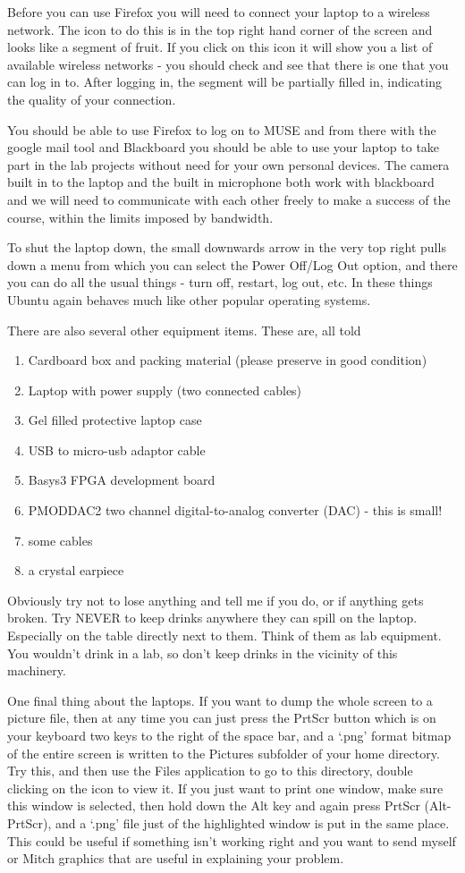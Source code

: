\documentclass[../physical_computing.tex]{subfiles}
\begin{document}
Before you can use Firefox you will need to connect your laptop to a wireless network. The icon to do this is in the top right hand corner of the screen and looks like a segment of fruit. If you click on this icon it will show you a list of available wireless networks - you should check and see that there is one that you can log in to. After logging in, the segment will be partially filled in, indicating the quality of your connection.

You should be able to use Firefox to log on to MUSE and from there with the google mail tool and Blackboard you should be able to use your laptop to take part in the lab projects without need for your own personal devices. The camera built in to the laptop and the built in microphone both work with blackboard and we will need to communicate with each other freely to make a success of the course, within the limits imposed by bandwidth.

To shut the laptop down, the small downwards arrow in the very top right pulls down a menu from which you can select the Power Off/Log Out option, and there you can do all the usual things - turn off, restart, log out, etc. In these things Ubuntu again behaves much like other popular operating systems.

There are also several other equipment items. These are, all told
\begin{enumerate}
    \item Cardboard box and packing material (please preserve in good condition)
    \item Laptop with power supply (two connected cables)
    \item Gel filled protective laptop case
    \item USB to micro-usb adaptor cable
    \item Basys3 FPGA development board
    \item PMODDAC2 two channel digital-to-analog converter (DAC) - this is small!
    \item some cables
    \item a crystal earpiece
\end{enumerate}

Obviously try not to lose anything and tell me if you do, or if anything gets broken. Try NEVER to keep drinks anywhere they can spill on the laptop. Especially on the table directly next to them. Think of them as lab equipment. You wouldn't drink in a lab, so don't keep drinks in the vicinity of this machinery.

One final thing about the laptops. If you want to dump the whole screen to a picture file, then at any time you can just press the PrtScr button which is on your keyboard two keys to the right of the space bar, and a `.png' format bitmap of the entire screen is written to the Pictures subfolder of your home directory. Try this, and then use the Files application to go to this directory, double clicking on the icon to view it. If you just want to print one window, make sure this window is selected, then hold down the Alt key and again press PrtScr (Alt-PrtScr), and a `.png' file just of the highlighted window is put in the same place. This could be useful if something isn't working right and you want to send myself or Mitch graphics that are useful in explaining your problem.
\end{document}
